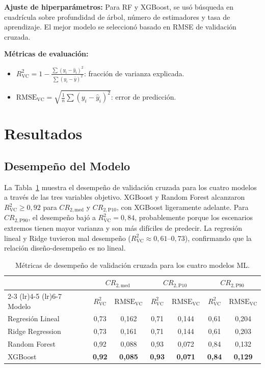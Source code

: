 \documentclass[preprint,12pt,authoryear]{elsarticle}
\newcommand{\CR}[1]{CR_{2,\text{#1}}}
\newcommand{\RMSE}{\mathrm{RMSE_{VC}}}
\newcommand{\Rsq}{R^{2}_{\mathrm{VC}}}
\begin{document}
\textbf{Ajuste de hiperparámetros:} Para RF y XGBoost, se usó búsqueda en cuadrícula sobre 
profundidad de árbol, número de estimadores y tasa de aprendizaje. El mejor modelo se 
seleccionó basado en RMSE de validación cruzada.

\textbf{Métricas de evaluación:}
\begin{itemize}[leftmargin=1.5em]
  \item $\Rsq = 1 - \frac{\sum (y_i - \hat{y}_i)^2}{\sum (y_i - \bar{y})^2}$: fracción de 
        varianza explicada.
  \item $\RMSE = \sqrt{\frac{1}{n}\sum (y_i - \hat{y}_i)^2}$: error de predicción.
\end{itemize}

\section{Resultados}
\label{sec:results}

\subsection{Desempeño del Modelo}
\label{sec:results:performance}

La Tabla~\ref{tab:ml_results} muestra el desempeño de validación cruzada para los cuatro 
modelos a través de las tres variables objetivo. XGBoost y Random Forest alcanzaron 
$\Rsq \geq 0{,}92$ para $\CR{med}$ y $\CR{P10}$, con XGBoost ligeramente adelante. Para 
$\CR{P90}$, el desempeño bajó a $\Rsq = 0{,}84$, probablemente porque los escenarios extremos 
tienen mayor varianza y son más difíciles de predecir. La regresión lineal y Ridge tuvieron 
mal desempeño ($\Rsq \approx 0{,}61$--$0{,}73$), confirmando que la relación diseño-desempeño 
es no lineal.

\begin{table}[htbp]
\centering
\caption{Métricas de desempeño de validación cruzada para los cuatro modelos ML.}
\label{tab:ml_results}
\small
\begin{tabular}{@{}lcccccc@{}}
\toprule
& \multicolumn{2}{c}{$\CR{med}$} & \multicolumn{2}{c}{$\CR{P10}$} & \multicolumn{2}{c}{$\CR{P90}$} \\
\cmidrule(lr){2-3} \cmidrule(lr){4-5} \cmidrule(lr){6-7}
Modelo & $\Rsq$ & $\RMSE$ & $\Rsq$ & $\RMSE$ & $\Rsq$ & $\RMSE$ \\
\midrule
Regresión Lineal  & 0,73 & 0,162 & 0,71 & 0,144 & 0,61 & 0,204 \\
Ridge Regression  & 0,73 & 0,161 & 0,71 & 0,144 & 0,61 & 0,203 \\
Random Forest     & 0,92 & 0,088 & 0,93 & 0,072 & 0,84 & 0,132 \\
XGBoost           & \textbf{0,92} & \textbf{0,085} & \textbf{0,93} & \textbf{0,071} & \textbf{0,84} & \textbf{0,129} \\
\bottomrule
\end{tabular}
\end{table}
\end{document}
